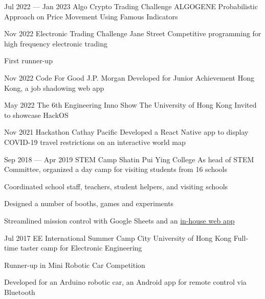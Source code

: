 \activityEntry
{Jul 2022 --- Jan 2023}
{Algo Crypto Trading Challenge}
{ALGOGENE}
{Probabilistic Approach on Price Movement Using Famous Indicators}
{}

\activityEntry
{Nov 2022}
{Electronic Trading Challenge}
{Jane Street}
{Competitive programming for high frequency electronic trading}
{
\begin{descitemize}
    \specialitem First runner-up
\end{descitemize}
}

\activityEntry
{Nov 2022}
{Code For Good}
{J.P. Morgan}
{Developed for Junior Achievement Hong Kong, a job shadowing web app}
{}

\activityEntry
{May 2022}
{The 6th Engineering Inno Show}
{The University of Hong Kong}
{Invited to showcase HackOS}
{}

\activityEntry
{Nov 2021}
{Hackathon}
{Cathay Pacific}
{Developed a React Native app to display COVID-19 travel restrictions on an interactive world map}
{}

\activityEntry
{Sep 2018 --- Apr 2019}
{\hypertarget{STEM_Camp_2019}{STEM Camp}}
{Shatin Pui Ying College}
{As head of STEM Committee, organized a day camp for visiting students from 16 schools}
{
\begin{descitemize}
    \item Coordinated school staff, teachers, student helpers, and visiting schools
    \item Designed a number of booths, games and experiments
    \item Streamlined mission control with Google Sheets and an \hyperlink{RTRMS}{in-house web app}
\end{descitemize}
}

\activityEntry
{Jul 2017}
{EE International Summer Camp}
{City University of Hong Kong}
{Full-time taster camp for Electronic Engineering}
{
\begin{descitemize}
    \specialitem Runner-up in Mini Robotic Car Competition
    \item Developed for an Arduino robotic car, an Android app for remote control via Bluetooth
\end{descitemize}
}